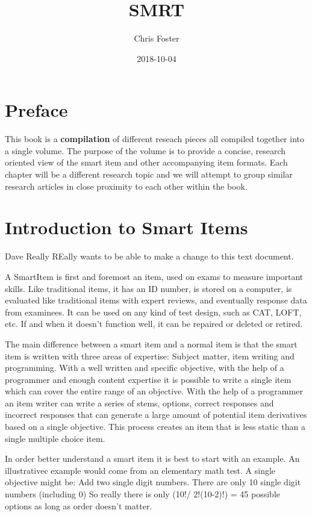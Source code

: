 \documentclass[]{book}
\title{SMRT}
\author{Chris Foster}
\date{2018-10-04}
\theoremstyle{definition}
\theoremstyle{definition}
\theoremstyle{definition}
\theoremstyle{remark}
\begin{document}
\maketitle

{
\setcounter{tocdepth}{1}
\tableofcontents
}
\chapter{Preface}\label{preface}

This book is a \textbf{compilation} of different reseach pieces all
compiled together into a single volume. The purpose of the volume is to
provide a concise, research oriented view of the smart item and other
accompanying item formats. Each chapter will be a different research
topic and we will attempt to group similar research articles in close
proximity to each other within the book.

\chapter{Introduction to Smart Items}\label{introduction-to-smart-items}

Dave Really REally wants to be able to make a change to this text
document.

A SmartItem is first and foremost an item, used on exams to measure
important skills. Like traditional items, it has an ID number, is stored
on a computer, is evaluated like traditional items with expert reviews,
and eventually response data from examinees. It can be used on any kind
of test design, such as CAT, LOFT, etc. If and when it doesn't function
well, it can be repaired or deleted or retired.

The main difference between a smart item and a normal item is that the
smart item is written with three areas of expertise: Subject matter,
item writing and programming. With a well written and specific
objective, with the help of a programmer and enough content expertise it
is possible to write a single item which can cover the entire range of
an objective. With the help of a programmer an item writer can write a
series of stems, options, correct responses and incorrect responses that
can generate a large amount of potential item derivatives based on a
single objective. This process creates an item that is less static than
a single multiple choice item.

In order better understand a smart item it is best to start with an
example. An illustrativec example would come from an elementary math
test. A single objective might be: Add two single digit numbers. There
are only 10 single digit numbers (including 0) So really there is only
(10!/ 2!(10-2)!) = 45 possible options as long as order doesn't matter.
\end{document}
